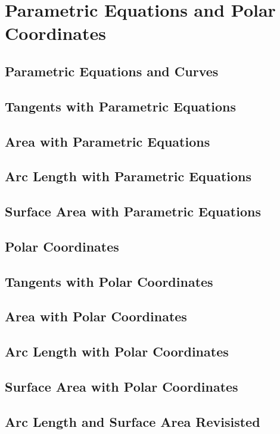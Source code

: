 \documentclass[../satmath.tex]{subfiles}
\begin{document}
\chapter{Parametric Equations and Polar Coordinates}
\section{Parametric Equations and Curves}
\section{Tangents with Parametric Equations}
\section{Area with Parametric Equations}
\section{Arc Length with Parametric Equations}
\section{Surface Area with Parametric Equations}
\section{Polar Coordinates}
\section{Tangents with Polar Coordinates}
\section{Area with Polar Coordinates}
\section{Arc Length with Polar Coordinates}
\section{Surface Area with Polar Coordinates}
\section{Arc Length and Surface Area Revisisted}
\end{document}
